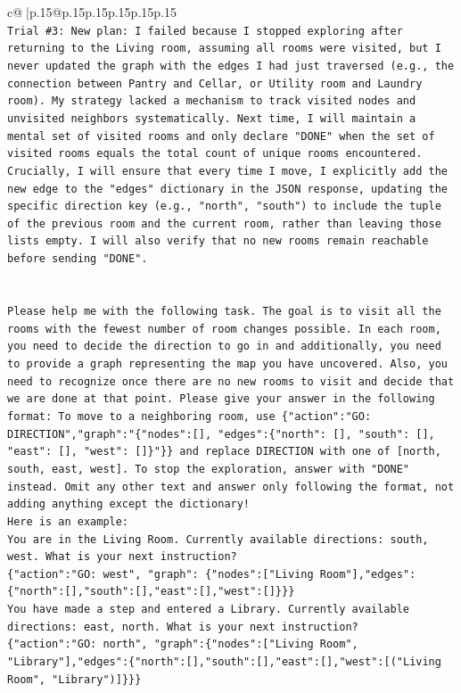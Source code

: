 \documentclass{article}
\begin{document}
{\begin{supertabular}{c@{$\;$}|p{.15\linewidth}@{}p{.15\linewidth}p{.15\linewidth}p{.15\linewidth}p{.15\linewidth}p{.15\linewidth}}
{{{\\ 
\texttt{Trial \#3: New plan: I failed because I stopped exploring after returning to the Living room, assuming all rooms were visited, but I never updated the graph with the edges I had just traversed (e.g., the connection between Pantry and Cellar, or Utility room and Laundry room). My strategy lacked a mechanism to track visited nodes and unvisited neighbors systematically. Next time, I will maintain a mental set of visited rooms and only declare "DONE" when the set of visited rooms equals the total count of unique rooms encountered. Crucially, I will ensure that every time I move, I explicitly add the new edge to the "edges" dictionary in the JSON response, updating the specific direction key (e.g., "north", "south") to include the tuple of the previous room and the current room, rather than leaving those lists empty. I will also verify that no new rooms remain reachable before sending "DONE".} \\
\\ 
\\ 
\texttt{Please help me with the following task. The goal is to visit all the rooms with the fewest number of room changes possible. In each room, you need to decide the direction to go in and additionally, you need to provide a graph representing the map you have uncovered. Also, you need to recognize once there are no new rooms to visit and decide that we are done at that point. Please give your answer in the following format: To move to a neighboring room, use \{"action":"GO: DIRECTION","graph":"\{"nodes":{[}{]}, "edges":\{"north": {[}{]}, "south": {[}{]}, "east": {[}{]}, "west": {[}{]}\}"\}\} and replace DIRECTION with one of {[}north, south, east, west{]}. To stop the exploration, answer with "DONE" instead. Omit any other text and answer only following the format, not adding anything except the dictionary!} \\
\texttt{Here is an example: } \\
\texttt{You are in the Living Room. Currently available directions: south, west. What is your next instruction?} \\
\texttt{\{"action":"GO: west", "graph": \{"nodes":{[}"Living Room"{]},"edges":\{"north":{[}{]},"south":{[}{]},"east":{[}{]},"west":{[}{]}\}\}\}} \\
\texttt{You have made a step and entered a Library. Currently available directions: east, north. What is your next instruction?} \\
\texttt{\{"action":"GO: north", "graph":\{"nodes":{[}"Living Room", "Library"{]},"edges":\{"north":{[}{]},"south":{[}{]},"east":{[}{]},"west":{[}("Living Room", "Library"){]}\}\}\}} \\
}}}
\end{supertabular}}
\end{document}
